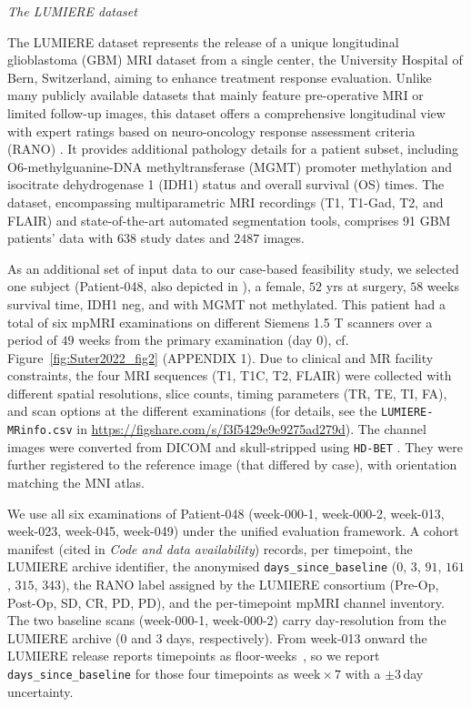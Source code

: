 \documentclass[a4paper,11pt,leqno]{article}
\begin{document}
\vspace{2mm}

\noindent \emph{The LUMIERE dataset}

\vspace{2mm}

The LUMIERE dataset \cite{Suter2022} represents the release of a unique longitudinal glioblastoma (GBM) MRI dataset from a single center, the University Hospital of Bern, Switzerland,
aiming to enhance treatment response evaluation. Unlike many publicly available datasets that mainly feature pre-operative MRI or limited follow-up images,
this dataset offers a comprehensive longitudinal view with expert ratings based on neuro-oncology response assessment criteria (RANO) \cite{Chukwueke2019}.
It provides additional pathology details for a patient subset, including O6-methylguanine-DNA methyltransferase (MGMT) promoter methylation
and isocitrate dehydrogenase 1 (IDH1) status and overall survival (OS) times.
The dataset, encompassing multiparametric MRI recordings (T1, T1-Gad, T2, and FLAIR) and state-of-the-art automated segmentation tools, comprises 91 GBM patients' data with $638$ study dates and $2487$ images.

As an additional set of input data to our case-based feasibility study, we selected
one subject (Patient-048, also depicted in \cite{Suter2022}), a female, $52$ yrs at surgery, $58$ weeks survival time, IDH1 neg, and with MGMT not methylated. This patient had a total of six mpMRI examinations on different Siemens 1.5 T scanners over a period of $49$ weeks from the primary examination (day 0), cf. Figure~\ref{fig:Suter2022_fig2} (APPENDIX 1). Due to clinical and MR facility constraints, the four MRI sequences (T1, T1C, T2, FLAIR) were collected with different spatial resolutions, slice counts, timing parameters (TR, TE, TI, FA), and scan options at the different examinations (for details,
see the \texttt{LUMIERE-MRinfo.csv} in {\small \url{https://figshare.com/s/f3f5429e9e9275ad279d}}).
The channel images were converted from DICOM and skull-stripped using \texttt{HD-BET} \cite{Isensee2019}. They were further registered to the reference image (that differed by case), with orientation matching the MNI atlas.

We use all six examinations of Patient-048 (week-000-1,
week-000-2, week-013, week-023, week-045, week-049) under the unified
evaluation framework. A cohort manifest (cited in \emph{Code and data
availability}) records, per timepoint, the LUMIERE archive identifier,
the anonymised \texttt{days\_since\_baseline} ($0$, $3$, $91$, $161$,
$315$, $343$), the RANO label assigned by the LUMIERE consortium
(Pre-Op, Post-Op, SD, CR, PD, PD), and the per-timepoint mpMRI channel
inventory. The two baseline scans (week-000-1, week-000-2) carry
day-resolution from the LUMIERE archive ($0$ and $3$ days, respectively). From week-013 onward the LUMIERE release reports
timepoints as floor-weeks~\cite{Suter2022}, so we report
\texttt{days\_since\_baseline} for those four timepoints as
$\mathrm{week}\times 7$ with a $\pm 3$\,day uncertainty.
\end{document}

